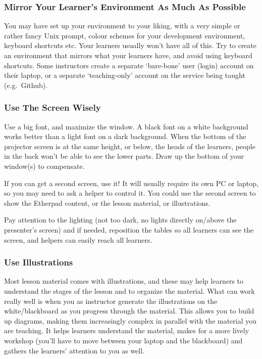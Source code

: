 \subsubsection{Mirror Your Learner's Environment As Much As
Possible}\label{mirror-your-learners-environment-as-much-as-possible}

You may have set up your environment to your liking, with a very simple
or rather fancy Unix prompt, colour schemes for your development
environment, keyboard shortcuts etc. Your learners usually won't have
all of this. Try to create an environment that mirrors what your
learners have, and avoid using keyboard shortcuts. Some instructors
create a separate `bare-bone' user (login) account on their laptop, or a
separate `teaching-only' account on the service being taught
(e.g.~Github).

\subsubsection{Use The Screen Wisely}\label{use-the-screen-wisely}

Use a big font, and maximize the window. A black font on a white
background works better than a light font on a dark background. When the
bottom of the projector screen is at the same height, or below, the
heads of the learners, people in the back won't be able to see the lower
parts. Draw up the bottom of your window(s) to compensate.

If you can get a second screen, use it! It will usually require its own
PC or laptop, so you may need to ask a helper to control it. You could
use the second screen to show the Etherpad content, or the lesson
material, or illustrations.

Pay attention to the lighting (not too dark, no lights directly on/above
the presenter's screen) and if needed, reposition the tables so all
learners can see the screen, and helpers can easily reach all learners.

\subsubsection{Use Illustrations}\label{use-illustrations}

Most lesson material comes with illustrations, and these may help
learners to understand the stages of the lesson and to organize the
material. What can work really well is when you as instructor generate
the illustrations on the white/blackboard as you progress through the
material. This allows you to build up diagrams, making them increasingly
complex in parallel with the material you are teaching. It helps
learners understand the material, makes for a more lively workshop
(you'll have to move between your laptop and the blackboard) and gathers
the learners' attention to you as well.

